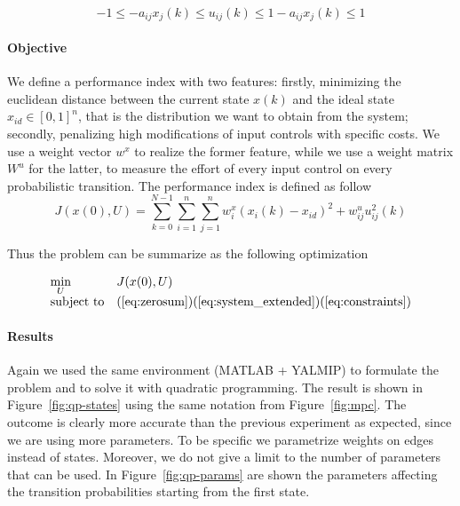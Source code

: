 \documentclass[a4paper, 11pt]{article}
\theoremstyle{definition}
\theoremstyle{remark}
\begin{document}
\begin{equation} \label{eq:constraints}
	-1 \leq -a_{ij}x_j(k) \leq u_{ij}(k) \leq 1-a_{ij}x_{j}(k) \leq 1
\end{equation}

\paragraph{Objective} %
\label{par:objective2}
We define a performance index with two features: firstly, minimizing the euclidean distance between the current state $x(k)$ and the ideal state $x_{id} \in [0,1]^n$, that is the distribution we want to obtain from the system; secondly, penalizing high modifications of input controls with specific costs. We use a weight vector $w^x$ to realize the former feature, while we use a weight matrix $W^u$ for the latter, to measure the effort of every input control on every probabilistic transition. The performance index is defined as follow
\begin{equation} \label{eq:index_ext}
	J(x(0),U) = \sum_{k=0}^{N-1}\sum_{i=1}^{n}\sum_{j=1}^{n} w_i^x(x_i(k) - x_{id})^2 + w_{ij}^u u^2_{ij}(k)
\end{equation}

Thus the problem can be summarize as the following optimization

\begin{equation} \label{eq:opt2}
	\begin{array}{ll}
		\underset{U}{\mbox{min}} & J(x(0),U) \\
		\mbox{subject to} &
		(\ref{eq:zerosum})(\ref{eq:system_extended})
		(\ref{eq:constraints}) \\
	\end{array}
\end{equation}


\paragraph{Results} %
\label{par:results2}
Again we used the same environment (MATLAB + YALMIP) to formulate the problem and to solve it with quadratic programming. The result is shown in Figure~\ref{fig:qp-states} using the same notation from Figure~\ref{fig:mpc}. The outcome is clearly more accurate than the previous experiment as expected, since we are using more parameters. To be specific we parametrize weights on edges instead of states. Moreover, we do not give a limit to the number of parameters that can be used. In Figure~\ref{fig:qp-params} are shown the parameters affecting the transition probabilities starting from the first state. 
\end{document}
